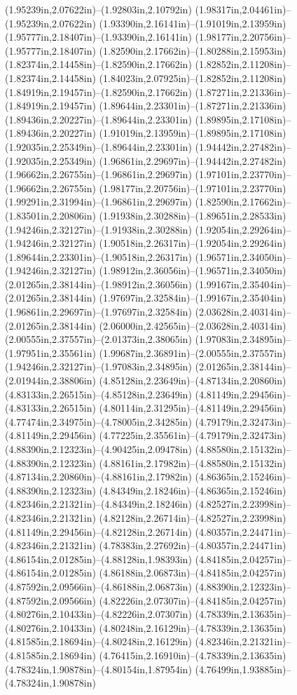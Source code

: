 (1.95239in,2.07622in)--(1.92803in,2.10792in) (1.98317in,2.04461in)--(1.95239in,2.07622in) (1.93390in,2.16141in)--(1.91019in,2.13959in) (1.95777in,2.18407in)--(1.93390in,2.16141in) (1.98177in,2.20756in)--(1.95777in,2.18407in) (1.82590in,2.17662in)--(1.80288in,2.15953in) (1.82374in,2.14458in)--(1.82590in,2.17662in) (1.82852in,2.11208in)--(1.82374in,2.14458in) (1.84023in,2.07925in)--(1.82852in,2.11208in) (1.84919in,2.19457in)--(1.82590in,2.17662in) (1.87271in,2.21336in)--(1.84919in,2.19457in) (1.89644in,2.23301in)--(1.87271in,2.21336in) (1.89436in,2.20227in)--(1.89644in,2.23301in) (1.89895in,2.17108in)--(1.89436in,2.20227in) (1.91019in,2.13959in)--(1.89895in,2.17108in) (1.92035in,2.25349in)--(1.89644in,2.23301in) (1.94442in,2.27482in)--(1.92035in,2.25349in) (1.96861in,2.29697in)--(1.94442in,2.27482in) (1.96662in,2.26755in)--(1.96861in,2.29697in) (1.97101in,2.23770in)--(1.96662in,2.26755in) (1.98177in,2.20756in)--(1.97101in,2.23770in) (1.99291in,2.31994in)--(1.96861in,2.29697in) (1.82590in,2.17662in)--(1.83501in,2.20806in) (1.91938in,2.30288in)--(1.89651in,2.28533in) (1.94246in,2.32127in)--(1.91938in,2.30288in) (1.92054in,2.29264in)--(1.94246in,2.32127in) (1.90518in,2.26317in)--(1.92054in,2.29264in) (1.89644in,2.23301in)--(1.90518in,2.26317in) (1.96571in,2.34050in)--(1.94246in,2.32127in) (1.98912in,2.36056in)--(1.96571in,2.34050in) (2.01265in,2.38144in)--(1.98912in,2.36056in) (1.99167in,2.35404in)--(2.01265in,2.38144in) (1.97697in,2.32584in)--(1.99167in,2.35404in) (1.96861in,2.29697in)--(1.97697in,2.32584in) (2.03628in,2.40314in)--(2.01265in,2.38144in) (2.06000in,2.42565in)--(2.03628in,2.40314in) (2.00555in,2.37557in)--(2.01373in,2.38065in) (1.97083in,2.34895in)--(1.97951in,2.35561in) (1.99687in,2.36891in)--(2.00555in,2.37557in) (1.94246in,2.32127in)--(1.97083in,2.34895in) (2.01265in,2.38144in)--(2.01944in,2.38806in) (4.85128in,2.23649in)--(4.87134in,2.20860in) (4.83133in,2.26515in)--(4.85128in,2.23649in) (4.81149in,2.29456in)--(4.83133in,2.26515in) (4.80114in,2.31295in)--(4.81149in,2.29456in) (4.77474in,2.34975in)--(4.78005in,2.34285in) (4.79179in,2.32473in)--(4.81149in,2.29456in) (4.77225in,2.35561in)--(4.79179in,2.32473in) (4.88390in,2.12323in)--(4.90425in,2.09478in) (4.88580in,2.15132in)--(4.88390in,2.12323in) (4.88161in,2.17982in)--(4.88580in,2.15132in) (4.87134in,2.20860in)--(4.88161in,2.17982in) (4.86365in,2.15246in)--(4.88390in,2.12323in) (4.84349in,2.18246in)--(4.86365in,2.15246in) (4.82346in,2.21321in)--(4.84349in,2.18246in) (4.82527in,2.23998in)--(4.82346in,2.21321in) (4.82128in,2.26714in)--(4.82527in,2.23998in) (4.81149in,2.29456in)--(4.82128in,2.26714in) (4.80357in,2.24471in)--(4.82346in,2.21321in) (4.78383in,2.27692in)--(4.80357in,2.24471in) (4.86154in,2.01285in)--(4.88128in,1.98393in) (4.84185in,2.04257in)--(4.86154in,2.01285in) (4.86188in,2.06873in)--(4.84185in,2.04257in) (4.87592in,2.09566in)--(4.86188in,2.06873in) (4.88390in,2.12323in)--(4.87592in,2.09566in) (4.82226in,2.07307in)--(4.84185in,2.04257in) (4.80276in,2.10433in)--(4.82226in,2.07307in) (4.78339in,2.13635in)--(4.80276in,2.10433in) (4.80248in,2.16129in)--(4.78339in,2.13635in) (4.81585in,2.18694in)--(4.80248in,2.16129in) (4.82346in,2.21321in)--(4.81585in,2.18694in) (4.76415in,2.16910in)--(4.78339in,2.13635in) (4.78324in,1.90878in)--(4.80154in,1.87954in) (4.76499in,1.93885in)--(4.78324in,1.90878in) 
